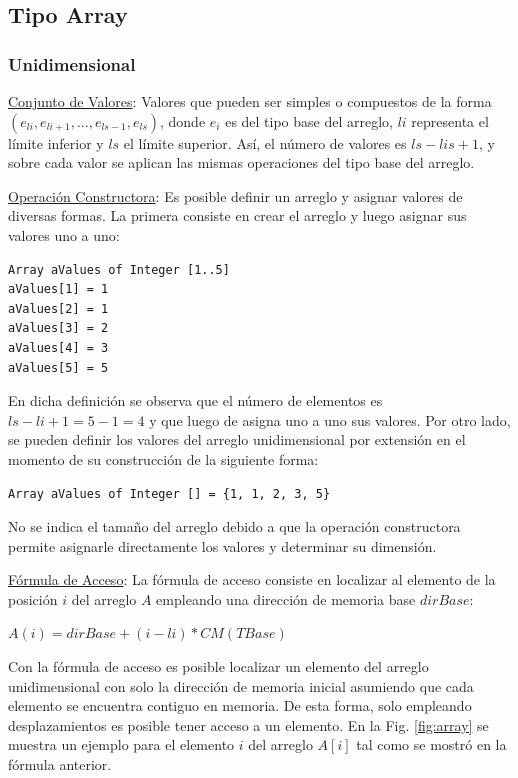 \subsection{Tipo Array}

\subsubsection{Unidimensional}

\underline{Conjunto de Valores}: Valores que pueden ser simples o compuestos de la forma $(e_{li}, e_{li+1}, ..., e_{ls-1}, e_{ls})$, donde $e_i$ es del tipo base del arreglo, $li$ representa el límite inferior y $ls$ el límite superior. Así, el número de valores es $ls - lis + 1$, y sobre cada valor se aplican las mismas operaciones del tipo base del arreglo.

\underline{Operación Constructora}: Es posible definir un arreglo y asignar valores de diversas formas. La primera consiste en crear el arreglo y luego asignar sus valores uno a uno:

\begin{lstlisting}[upquote=true, language=pseudo]
Array aValues of Integer [1..5]
aValues[1] = 1
aValues[2] = 1
aValues[3] = 2
aValues[4] = 3
aValues[5] = 5
\end{lstlisting}

En dicha definición se observa que el número de elementos es $ls - li + 1 = 5 - 1 = 4$ y que luego de asigna uno a uno sus valores. Por otro lado, se pueden definir los valores del arreglo unidimensional por extensión en el momento de su construcción de la siguiente forma:

\begin{lstlisting}[upquote=true, language=pseudo]
Array aValues of Integer [] = {1, 1, 2, 3, 5}
\end{lstlisting}

No se indica el tamaño del arreglo debido a que la operación constructora permite asignarle directamente los valores y determinar su dimensión.

\underline{Fórmula de Acceso}: La fórmula de acceso consiste en localizar al elemento de la posición $i$ del arreglo $A$ empleando una dirección de memoria base $dirBase$:

$A(i) = dirBase + (i - li) * CM(TBase)$

Con la fórmula de acceso es posible localizar un elemento del arreglo unidimensional con solo la dirección de memoria inicial asumiendo que cada elemento se encuentra contiguo en memoria. De esta forma, solo empleando desplazamientos es posible tener acceso a un elemento. En la Fig. \ref{fig:array} se muestra un ejemplo para el elemento $i$ del arreglo $A[i]$ tal como se mostró en la fórmula anterior.

